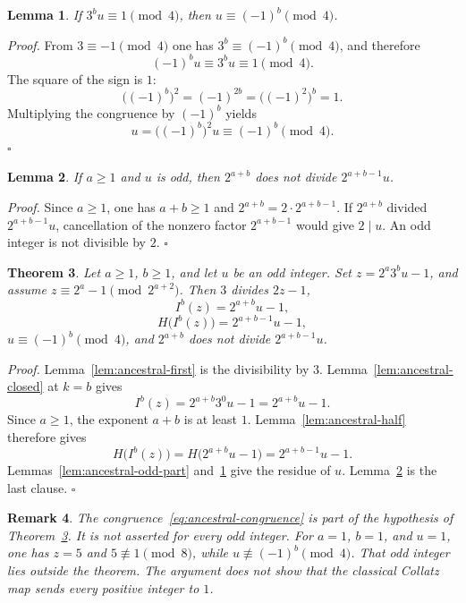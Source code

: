 \documentclass[11pt,letterpaper]{article}
\newtheorem{theorem}{Theorem}
\newtheorem{lemma}[theorem]{Lemma}
\newtheorem{remark}[theorem]{Remark}
\newenvironment{proof}{\noindent\textit{Proof.}}{\hfill\(\square\)}
\begin{document}
\begin{lemma}
\label{lem:ancestral-residue}
If \(3^{b}u\equiv 1\pmod{4}\), then \(u\equiv(-1)^{b}\pmod{4}\).
\end{lemma}

\begin{proof}
From \(3\equiv -1\pmod{4}\) one has \(3^{b}\equiv(-1)^{b}\pmod{4}\), and
therefore
\[
(-1)^{b}u\equiv 3^{b}u\equiv 1\pmod{4}.
\]
The square of the sign is \(1\):
\[
\bigl((-1)^{b}\bigr)^{2}=(-1)^{2b}=\bigl((-1)^{2}\bigr)^{b}=1.
\]
Multiplying the congruence by \((-1)^{b}\) yields
\[
u=\bigl((-1)^{b}\bigr)^{2}u\equiv(-1)^{b}\pmod{4}.
\]
\end{proof}

\begin{lemma}
\label{lem:ancestral-exact}
If \(a\ge 1\) and \(u\) is odd, then \(2^{a+b}\) does not divide
\(2^{a+b-1}u\).
\end{lemma}

\begin{proof}
Since \(a\ge 1\), one has \(a+b\ge 1\) and
\(2^{a+b}=2\cdot 2^{a+b-1}\). If \(2^{a+b}\) divided \(2^{a+b-1}u\),
cancellation of the nonzero factor \(2^{a+b-1}\) would give \(2\mid u\).
An odd integer is not divisible by \(2\).
\end{proof}

\begin{theorem}
\label{thm:ancestral-join}
Let \(a\ge 1\), \(b\ge 1\), and let \(u\) be an odd integer. Set
\(z=2^{a}3^{b}u-1\), and assume
\(z\equiv 2^{a}-1\pmod{2^{a+2}}\). Then \(3\) divides \(2z-1\),
\[
I^{b}(z)=2^{a+b}u-1,
\]
\[
H\bigl(I^{b}(z)\bigr)=2^{a+b-1}u-1,
\]
\(u\equiv(-1)^{b}\pmod{4}\), and \(2^{a+b}\) does not divide
\(2^{a+b-1}u\).
\end{theorem}

\begin{proof}
Lemma~\ref{lem:ancestral-first} is the divisibility by \(3\).
Lemma~\ref{lem:ancestral-closed} at \(k=b\) gives
\[
I^{b}(z)=2^{a+b}3^{0}u-1=2^{a+b}u-1.
\]
Since \(a\ge 1\), the exponent \(a+b\) is at least \(1\).
Lemma~\ref{lem:ancestral-half} therefore gives
\[
H\bigl(I^{b}(z)\bigr)=H\bigl(2^{a+b}u-1\bigr)=2^{a+b-1}u-1.
\]
Lemmas~\ref{lem:ancestral-odd-part} and~\ref{lem:ancestral-residue} give the
residue of \(u\). Lemma~\ref{lem:ancestral-exact} is the last clause.
\end{proof}

\begin{remark}
\label{rem:ancestral-scope}
The congruence~\eqref{eq:ancestral-congruence} is part of the hypothesis of
Theorem~\ref{thm:ancestral-join}. It is not asserted for every odd integer.
For \(a=1\), \(b=1\), and \(u=1\), one has \(z=5\) and
\(5\not\equiv 1\pmod{8}\), while \(u\not\equiv(-1)^{b}\pmod{4}\). That odd
integer lies outside the theorem. The argument does not show that the
classical Collatz map sends every positive integer to \(1\).
\end{remark}
\end{document}

